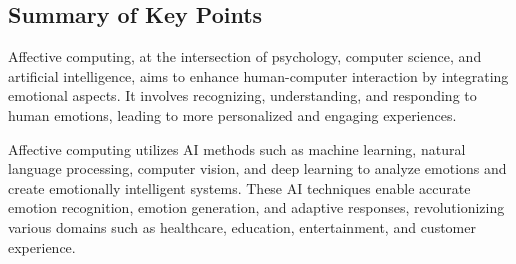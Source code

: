 \subsection{Summary of Key Points}
Affective computing, at the intersection of psychology, computer science, and artificial intelligence, 
aims to enhance human-computer interaction by integrating emotional aspects. 
It involves recognizing, understanding, and responding to human emotions, leading to more personalized and engaging experiences.

Affective computing utilizes AI methods such as machine learning, natural language processing, computer vision, and deep learning to analyze emotions 
and create emotionally intelligent systems. These AI techniques enable accurate emotion recognition, emotion generation, and adaptive responses, 
revolutionizing various domains such as healthcare, education, entertainment, and customer experience.


